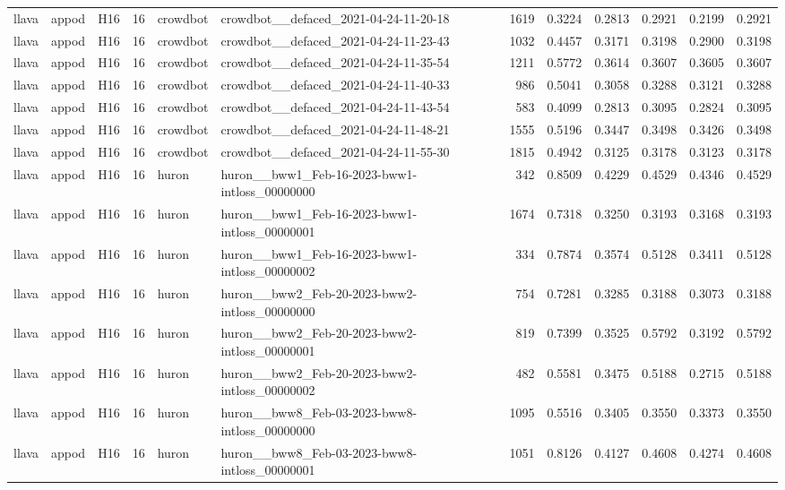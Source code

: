 \begin{table}[tbp]
\begin{tabular}{lllrllrrrrrr}
llava & appod & H16 & 16 & crowdbot & crowdbot\_\_defaced\_2021-04-24-11-20-18 & 1619 & 0.3224 & 0.2813 & 0.2921 & 0.2199 & 0.2921 \\
llava & appod & H16 & 16 & crowdbot & crowdbot\_\_defaced\_2021-04-24-11-23-43 & 1032 & 0.4457 & 0.3171 & 0.3198 & 0.2900 & 0.3198 \\
llava & appod & H16 & 16 & crowdbot & crowdbot\_\_defaced\_2021-04-24-11-35-54 & 1211 & 0.5772 & 0.3614 & 0.3607 & 0.3605 & 0.3607 \\
llava & appod & H16 & 16 & crowdbot & crowdbot\_\_defaced\_2021-04-24-11-40-33 & 986 & 0.5041 & 0.3058 & 0.3288 & 0.3121 & 0.3288 \\
llava & appod & H16 & 16 & crowdbot & crowdbot\_\_defaced\_2021-04-24-11-43-54 & 583 & 0.4099 & 0.2813 & 0.3095 & 0.2824 & 0.3095 \\
llava & appod & H16 & 16 & crowdbot & crowdbot\_\_defaced\_2021-04-24-11-48-21 & 1555 & 0.5196 & 0.3447 & 0.3498 & 0.3426 & 0.3498 \\
llava & appod & H16 & 16 & crowdbot & crowdbot\_\_defaced\_2021-04-24-11-55-30 & 1815 & 0.4942 & 0.3125 & 0.3178 & 0.3123 & 0.3178 \\
llava & appod & H16 & 16 & huron & huron\_\_bww1\_Feb-16-2023-bww1-intloss\_00000000 & 342 & 0.8509 & 0.4229 & 0.4529 & 0.4346 & 0.4529 \\
llava & appod & H16 & 16 & huron & huron\_\_bww1\_Feb-16-2023-bww1-intloss\_00000001 & 1674 & 0.7318 & 0.3250 & 0.3193 & 0.3168 & 0.3193 \\
llava & appod & H16 & 16 & huron & huron\_\_bww1\_Feb-16-2023-bww1-intloss\_00000002 & 334 & 0.7874 & 0.3574 & 0.5128 & 0.3411 & 0.5128 \\
llava & appod & H16 & 16 & huron & huron\_\_bww2\_Feb-20-2023-bww2-intloss\_00000000 & 754 & 0.7281 & 0.3285 & 0.3188 & 0.3073 & 0.3188 \\
llava & appod & H16 & 16 & huron & huron\_\_bww2\_Feb-20-2023-bww2-intloss\_00000001 & 819 & 0.7399 & 0.3525 & 0.5792 & 0.3192 & 0.5792 \\
llava & appod & H16 & 16 & huron & huron\_\_bww2\_Feb-20-2023-bww2-intloss\_00000002 & 482 & 0.5581 & 0.3475 & 0.5188 & 0.2715 & 0.5188 \\
llava & appod & H16 & 16 & huron & huron\_\_bww8\_Feb-03-2023-bww8-intloss\_00000000 & 1095 & 0.5516 & 0.3405 & 0.3550 & 0.3373 & 0.3550 \\
llava & appod & H16 & 16 & huron & huron\_\_bww8\_Feb-03-2023-bww8-intloss\_00000001 & 1051 & 0.8126 & 0.4127 & 0.4608 & 0.4274 & 0.4608 \\

\end{tabular}
\end{table}

